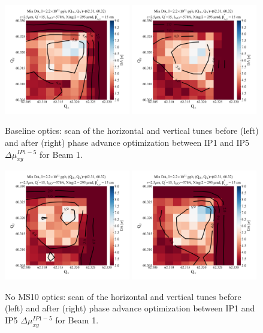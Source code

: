 \documentclass{cernatsnote}
\begin{document}
\begin{figure}[h!]
\centering
\includegraphics[width=0.49\textwidth]{images/q_vs_da_Base_muxy_0.png} \hfill \includegraphics[width=0.49\textwidth]{images/q_vs_da_Base_muxy_optim.png} \\
\caption{\label{da_scan_ms14fms14d} Baseline optics: scan of the horizontal and vertical tunes before (left) and after (right) phase advance optimization between IP1 and IP5 $\Delta\mu_{xy}^{IP1-5}$ for Beam 1.}
\end{figure}
\begin{figure}[h!]
\centering
\includegraphics[width=0.49\textwidth]{images/q_vs_da_noms10_muxy_0.png} \hfill \includegraphics[width=0.49\textwidth]{images/q_vs_da_noms10_muxy_optim.png} \\
\caption{\label{da_scan_ms14fms14d} No MS10 optics: scan of the horizontal and vertical tunes before (left) and after (right) phase advance optimization between IP1 and IP5 $\Delta\mu_{xy}^{IP1-5}$ for Beam 1.}
\end{figure}
\end{document}
